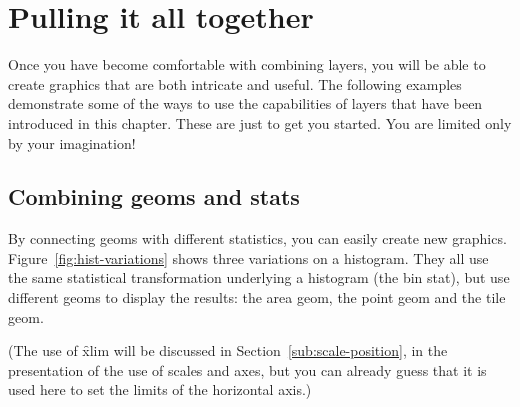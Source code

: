 \section{Pulling it all together}
\label{sec:pull-together}

Once you have become comfortable with combining layers, you will be able to create graphics that are both intricate and useful.  The following examples demonstrate some of the ways to use the capabilities of layers that have been introduced in this chapter.  These are just to get you started. You are limited only by your imagination!

\subsection{Combining geoms and stats}
\label{sub:new_plot_types}

By connecting geoms with different statistics, you can easily create new graphics.  Figure~\ref{fig:hist-variations} shows three variations on a histogram.  They all use the same statistical transformation underlying a histogram (the bin stat), but use different geoms to display the results: the area geom, the point geom and the tile geom.  

% 



(The use of \f{xlim} will be discussed in Section~\ref{sub:scale-position}, in the presentation of the use of scales and axes, but you can already guess that it is used here to set the limits of the horizontal axis.)

% 


